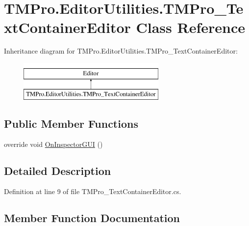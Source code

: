 \hypertarget{class_t_m_pro_1_1_editor_utilities_1_1_t_m_pro___text_container_editor}{}\section{T\+M\+Pro.\+Editor\+Utilities.\+T\+M\+Pro\+\_\+\+Text\+Container\+Editor Class Reference}
\label{class_t_m_pro_1_1_editor_utilities_1_1_t_m_pro___text_container_editor}
Inheritance diagram for T\+M\+Pro.\+Editor\+Utilities.\+T\+M\+Pro\+\_\+\+Text\+Container\+Editor\+:\begin{figure}[H]
\begin{center}
\leavevmode
\includegraphics[height=2.000000cm]{class_t_m_pro_1_1_editor_utilities_1_1_t_m_pro___text_container_editor}
\end{center}
\end{figure}
\subsection*{Public Member Functions}
\begin{DoxyCompactItemize}
\item 
override void \mbox{\hyperlink{class_t_m_pro_1_1_editor_utilities_1_1_t_m_pro___text_container_editor_a90727af206d0503f854cb4cb8ba339c1}{On\+Inspector\+G\+UI}} ()
\end{DoxyCompactItemize}


\subsection{Detailed Description}


Definition at line 9 of file T\+M\+Pro\+\_\+\+Text\+Container\+Editor.\+cs.



\subsection{Member Function Documentation}
\mbox{\label{class_t_m_pro_1_1_editor_utilities_1_1_t_m_pro___text_container_editor_a90727af206d0503f854cb4cb8ba339c1}} 
